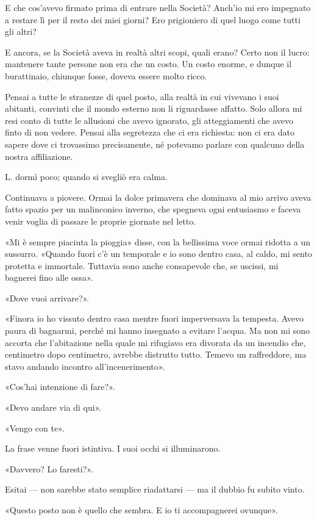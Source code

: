 E che cos'avevo firmato prima di entrare nella Società? Anch'io mi ero impegnato a restare lì per il
resto dei miei giorni? Ero prigioniero di quel luogo come tutti gli altri?

E ancora, se la Società aveva in realtà altri scopi, quali erano? Certo non il lucro: mantenere
tante persone non era che un costo. Un costo enorme, e dunque il burattinaio, chiunque fosse, doveva
essere molto ricco.

Pensai a tutte le stranezze di quel posto, alla realtà in cui vivevano i suoi abitanti, convinti che
il mondo esterno non li riguardasse affatto. Solo allora mi resi conto di tutte le allusioni che
avevo ignorato, gli atteggiamenti che avevo finto di non vedere. Pensai alla segretezza che ci era
richiesta: non ci era dato sapere dove ci trovassimo precisamente, né potevamo parlare con qualcuno
della nostra affiliazione.

L. dormì poco; quando si svegliò era calma.

Continuava a piovere. Ormai la dolce primavera che dominava al mio arrivo aveva fatto spazio per un
malinconico inverno, che spegneva ogni entusiasmo e faceva venir voglia di passare le proprie
giornate nel letto.

«Mi è sempre piaciuta la pioggia» disse, con la bellissima voce ormai ridotta a un sussurro. «Quando
fuori c'è un temporale e io sono dentro casa, al caldo, mi sento protetta e immortale. Tuttavia sono
anche consapevole che, se uscissi, mi bagnerei fino alle ossa».

«Dove vuoi arrivare?».

«Finora io ho vissuto dentro casa mentre fuori imperversava la tempesta. Avevo paura di bagnarmi,
perché mi hanno insegnato a evitare l'acqua. Ma non mi sono accorta che l'abitazione nella quale mi
rifugiavo era divorata da un incendio che, centimetro dopo centimetro, avrebbe distrutto tutto.
Temevo un raffreddore, ma stavo andando incontro all'incenerimento».

«Cos'hai intenzione di fare?».

«Devo andare via di qui».

«Vengo con te».

La frase venne fuori istintiva. I suoi occhi si illuminarono.

«Davvero? Lo faresti?».

Esitai --- non sarebbe stato semplice riadattarsi --- ma il dubbio fu subito vinto.

«Questo posto non è quello che sembra. E io ti accompagnerei ovunque».

